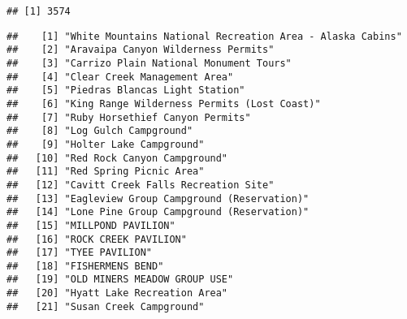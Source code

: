 \documentclass[
]{article}
\newenvironment{Shaded}{\begin{snugshade}}{\end{snugshade}}
\newcommand{\FunctionTok}[1]{\textcolor[rgb]{0.00,0.00,0.00}{#1}}
\newcommand{\NormalTok}[1]{#1}
\newcommand{\SpecialCharTok}[1]{\textcolor[rgb]{0.00,0.00,0.00}{#1}}
\begin{document}
\begin{verbatim}
## [1] 3574
\end{verbatim}

\begin{Shaded}
\end{Shaded}

\begin{verbatim}
##    [1] "White Mountains National Recreation Area - Alaska Cabins"                            
##    [2] "Aravaipa Canyon Wilderness Permits"                                                  
##    [3] "Carrizo Plain National Monument Tours"                                               
##    [4] "Clear Creek Management Area"                                                         
##    [5] "Piedras Blancas Light Station"                                                       
##    [6] "King Range Wilderness Permits (Lost Coast)"                                          
##    [7] "Ruby Horsethief Canyon Permits"                                                      
##    [8] "Log Gulch Campground"                                                                
##    [9] "Holter Lake Campground"                                                              
##   [10] "Red Rock Canyon Campground"                                                          
##   [11] "Red Spring Picnic Area"                                                              
##   [12] "Cavitt Creek Falls Recreation Site"                                                  
##   [13] "Eagleview Group Campground (Reservation)"                                            
##   [14] "Lone Pine Group Campground (Reservation)"                                            
##   [15] "MILLPOND PAVILION"                                                                   
##   [16] "ROCK CREEK PAVILION"                                                                 
##   [17] "TYEE PAVILION"                                                                       
##   [18] "FISHERMENS BEND"                                                                     
##   [19] "OLD MINERS MEADOW GROUP USE"                                                         
##   [20] "Hyatt Lake Recreation Area"                                                          
##   [21] "Susan Creek Campground"                                                              

\end{verbatim}
\end{document}
